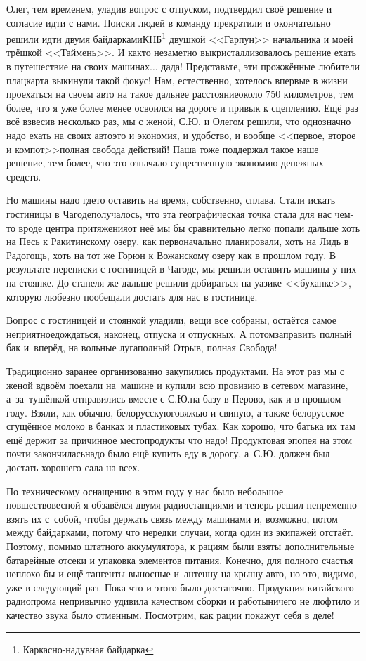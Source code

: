 \renewcommand*{\thefootnote}{\fnsymbol{footnote}}
Олег, тем временем, уладив вопрос с отпуском, подтвердил своё решение и согласие идти с нами. Поиски людей в команду прекратили и окончательно решили идти двумя байдарками\mdash КНБ\footnote[1]{Каркасно-надувная байдарка} двушкой <<Гарпун>> начальника и моей трёшкой <<Таймень>>. И как\sdash то незаметно выкристаллизовалось решение ехать в путешествие на своих машинах$\ldots$ да\sdash да! Представьте, эти прожжённые любители плацкарта выкинули такой фокус! Нам, естественно, хотелось впервые в жизни проехаться на своем авто на такое дальнее расстояние\mdash около 750 километров, тем более, что я уже более менее освоился на дороге и привык к сцеплению. Ещё раз всё взвесив несколько раз, мы с женой, С.Ю. и Олегом решили, что однозначно надо ехать на своих авто\mdash это и экономия, и удобство, и вообще <<первое, второе и компот>>\mdash полная свобода действий! Паша тоже поддержал такое наше решение, тем более, что это означало существенную экономию денежных средств. 

Но машины надо где\sdash то оставить на время, собственно, сплава. Стали искать гостиницы в Чагоде\mdash получалось, что эта географическая точка стала для нас чем-то вроде центра притяжения\mdash от неё мы бы сравнительно легко попали дальше хоть на Песь к Ракитинскому озеру, как первоначально планировали, хоть на Лидь в Радогощь, хоть на тот же Горюн к Вожанскому озеру как в прошлом году. В результате переписки с гостиницей в Чагоде, мы решили оставить машины у них на стоянке. До стапеля же дальше решили добираться на уазике <<буханке>>, которую любезно пообещали достать для нас в гостинице. 

Вопрос с гостиницей и стоянкой уладили, вещи все собраны, остаётся самое неприятное\mdash дождаться, наконец, отпуска и отпускных. А потом\mdash заправить полный бак и~вперёд, на вольные луга\mdash полный Отрыв, полная Свобода! 

Традиционно заранее организованно закупились продуктами. На этот раз мы с женой вдвоём поехали на~машине и купили всю провизию в сетевом магазине, а~за~тушёнкой отправились вместе с С.Ю.\mdash на базу в Перово, как и в прошлом году. Взяли, как обычно, белорусскую\mdash говяжью и свиную, а также белорусское сгущённое молоко в банках и пластиковых тубах. Как хорошо, что батька их там ещё держит за причинное место\mdash продукты что надо! Продуктовая эпопея на этом почти закончилась\mdash надо было ещё купить еду в дорогу, а~С.Ю. должен был достать хорошего сала на всех.

По техническому оснащению в этом году у нас было небольшое новшество\mdash весной я обзавёлся двумя радиостанциями и теперь решил непременно взять их с~собой, чтобы держать связь между машинами и, возможно, потом между байдарками, потому что нередки случаи, когда один из экипажей отстаёт. Поэтому, помимо штатного аккумулятора, к рациям были взяты дополнительные батарейные отсеки и упаковка элементов питания. Конечно, для полного счастья неплохо бы и ещё тангенты выносные и~антенну на крышу авто, но это, видимо, уже в следующий раз. Пока что и этого было достаточно. Продукция китайского радиопрома непривычно удивила качеством сборки и работы\mdash ничего не люфтило и качество звука было отменным. Посмотрим, как рации покажут себя в деле!

